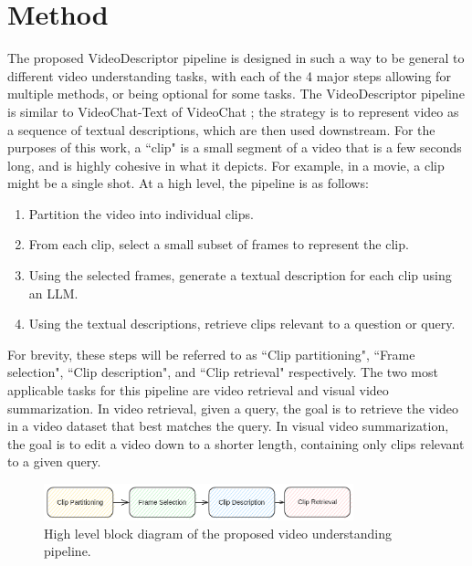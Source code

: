 \section{Method}


The proposed VideoDescriptor pipeline is designed in such a way to be general to different video understanding tasks, with each of the 4 major steps allowing for multiple methods, or being optional for some tasks.
The VideoDescriptor pipeline is similar to VideoChat-Text of VideoChat \cite{videochat}; the strategy is to represent video as a sequence of textual descriptions, which are then used downstream.
For the purposes of this work, a ``clip" is a small segment of a video that is a few seconds long, 
and is highly cohesive in what it depicts. For example, in a movie, a clip might be a single shot.
At a high level, the pipeline is as follows:
\begin{enumerate}
      \item Partition the video into individual clips.
      \item From each clip, select a small subset of frames to represent the clip.
      \item Using the selected frames, generate a textual description for each clip using an LLM.
      \item Using the textual descriptions, retrieve clips relevant to a question or query.
\end{enumerate}

For brevity, these steps will be referred to as ``Clip partitioning", ``Frame selection", ``Clip description", and ``Clip retrieval" respectively.
The two most applicable tasks for this pipeline are video retrieval and visual video summarization.
In video retrieval, given a query, the goal is to retrieve the video in a video dataset that best matches the query.
In visual video summarization, the goal is to edit a video down to a shorter length, containing only clips relevant to a given query.

\begin{figure}[h]
      \centering
      \includegraphics[width=0.8\textwidth]{figures/pipeline.png}
      \caption{High level block diagram of the proposed video understanding pipeline.}
      \label{fig:pipeline}
\end{figure}




